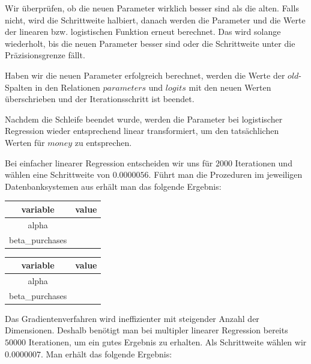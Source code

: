 Wir überprüfen, ob die neuen Parameter wirklich besser sind als die alten. Falls nicht, wird die Schrittweite halbiert, danach werden die Parameter und die Werte der linearen bzw. logistischen Funktion erneut berechnet. Das wird solange wiederholt, bis die neuen Parameter besser sind oder die Schrittweite unter die Präzisionsgrenze fällt.

Haben wir die neuen Parameter erfolgreich berechnet, werden die Werte der $old$-Spalten in den Relationen $parameters$ und $logits$ mit den neuen Werten überschrieben und der Iterationsschritt ist beendet.

Nachdem die Schleife beendet wurde, werden die Parameter bei logistischer Regression wieder entsprechend linear transformiert, um den tatsächlichen Werten für $money$ zu entsprechen.

Bei einfacher linearer Regression entscheiden wir uns für $2000$ Iterationen und wählen eine Schrittweite von $0.0000056$. Führt man die Prozeduren im jeweiligen Datenbanksystemen aus erhält man das folgende Ergebnis:

\begin{center}
  \begin{tabular}{|c|c|}\hline
    \textbf{variable} & \textbf{value} \\ \hline
    alpha &  \\ \hline
    beta\_purchases &  \\ \hline
  \end{tabular}

  \begin{tabular}{|c|c|}\hline
    \textbf{variable} & \textbf{value} \\ \hline
    alpha &  \\ \hline
    beta\_purchases &  \\ \hline
  \end{tabular}
\end{center}

Das Gradientenverfahren wird ineffizienter mit steigender Anzahl der Dimensionen. Deshalb benötigt man bei multipler linearer Regression bereits $50000$ Iterationen, um ein gutes Ergebnis zu erhalten. Als Schrittweite wählen wir $0.0000007$. Man erhält das folgende Ergebnis:

